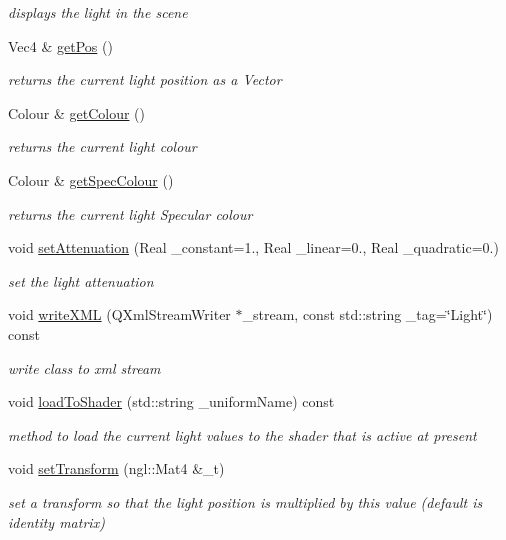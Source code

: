 \begin{DoxyCompactItemize}
\begin{DoxyCompactList}\small\item\em displays the light in the scene \end{DoxyCompactList}\item 
Vec4 \& \hyperlink{classngl_1_1_light_a57a8c683f7db93d059a4a2467ac3e980}{get\-Pos} ()
\begin{DoxyCompactList}\small\item\em returns the current light position as a Vector \end{DoxyCompactList}\item 
Colour \& \hyperlink{classngl_1_1_light_a8d3daa5594e73456cae3555aac07136d}{get\-Colour} ()
\begin{DoxyCompactList}\small\item\em returns the current light colour \end{DoxyCompactList}\item 
Colour \& \hyperlink{classngl_1_1_light_ac7438a00c9bca8655dce924a338d93c6}{get\-Spec\-Colour} ()
\begin{DoxyCompactList}\small\item\em returns the current light Specular colour \end{DoxyCompactList}\item 
void \hyperlink{classngl_1_1_light_afb7b9d8db15a4fd4e923049946e71681}{set\-Attenuation} (Real \-\_\-constant=1., Real \-\_\-linear=0., Real \-\_\-quadratic=0.)
\begin{DoxyCompactList}\small\item\em set the light attenuation \end{DoxyCompactList}\item 
void \hyperlink{classngl_1_1_light_a7bc1c8e03bf7647364474b346ec37a09}{write\-X\-M\-L} (Q\-Xml\-Stream\-Writer $\ast$\-\_\-stream, const std\-::string \-\_\-tag=\char`\"{}Light\char`\"{}) const 
\begin{DoxyCompactList}\small\item\em write class to xml stream \end{DoxyCompactList}\item 
void \hyperlink{classngl_1_1_light_a2f082480063a6b066864d4d0f056e4f1}{load\-To\-Shader} (std\-::string \-\_\-uniform\-Name) const 
\begin{DoxyCompactList}\small\item\em method to load the current light values to the shader that is active at present \end{DoxyCompactList}\item 
void \hyperlink{classngl_1_1_light_a329aacaa1907e39a44c7bcbd3d4ae0aa}{set\-Transform} (ngl\-::\-Mat4 \&\-\_\-t)
\begin{DoxyCompactList}\small\item\em set a transform so that the light position is multiplied by this value (default is identity matrix) \end{DoxyCompactList}\end{DoxyCompactItemize}
